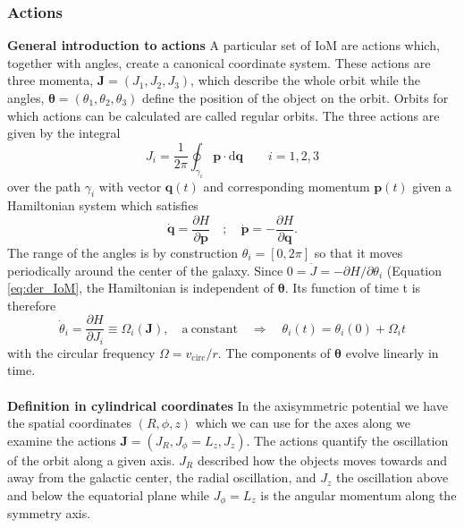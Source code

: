 \subsubsection{Actions}
\textbf{General introduction to actions} A particular set of \ac{IoM} are actions which, together with angles, create a canonical coordinate system. These actions are three momenta, $\mathbf{J} = (J_1, J_2, J_3)$, which describe the whole orbit while the angles, $\bm{\theta} = (\theta_1, \theta_2, \theta_3) $ define the position of the object on the orbit. Orbits for which actions can be calculated are called regular orbits. The three actions are given by the integral
\begin{equation}
    J_i = \frac{1}{2\pi}\oint_{\gamma_i}\mathbf{p}\cdot\mathrm{d}\mathbf{q} \qquad i = 1,2,3
\end{equation}
over the path $\gamma_i$ with vector $\mathbf{q}(t)$ and corresponding momentum $\mathbf{p}(t)$ given a Hamiltonian system which satisfies 
\begin{equation}
    \dot{\mathbf{q}} = \frac{\partial H}{\partial \mathbf{p}} \quad;\quad \dot{\mathbf{p}} = - \frac{\partial H}{\partial \mathbf{q}}. 
\end{equation}
The range of the angles is by construction $\theta_i = [0,2\pi]$ so that it moves periodically around the center of the galaxy. Since $0 = \dot{J} = -\partial H / \partial\theta_i$ (Equation \ref{eq:der_IoM}, the Hamiltonian is independent of $\bm{\theta}$. Its function of time t is therefore 
\begin{equation}
    \dot{\theta}_i = \frac{\partial H}{\partial J_i} \equiv \Omega_i(\mathbf{J}), \quad \mathrm{a\ constant} \quad \Rightarrow\quad \theta_i(t) = \theta_i(0) +  \Omega_i t
\end{equation}
with the circular frequency $\Omega = v_\mathrm{circ}/r$. The components of $\bm{\theta}$ evolve linearly in time. 
\\\\\textbf{Definition in cylindrical coordinates} In the axisymmetric potential we have the spatial coordinates $(R, \phi, z)$ which we can use for the axes along we examine the actions $\mathbf{J} = (J_R, J_\phi = L_z, J_z)$. The actions quantify the oscillation of the orbit along a given axis. $J_R$ described how the objects moves towards and away from the galactic center, the radial oscillation, and $J_z$ the oscillation above and below the equatorial plane while $J_\phi = L_z$ is the angular momentum along the symmetry axis. 

